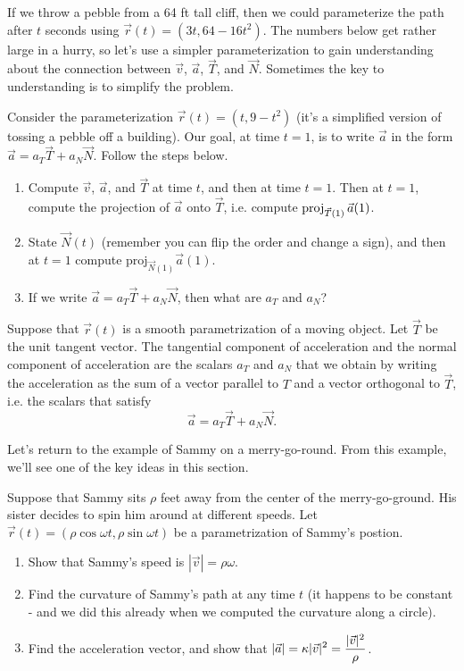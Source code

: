 If we throw a pebble from a 64 ft tall cliff, then we could parameterize the path after $t$ seconds using $\vec r(t) = (3t,64-16t^2)$. The numbers below get rather large in a hurry, so let's use a simpler parameterization to gain understanding about the connection between $\vec v$, $\vec a$, $\vec T$, and $\vec N$.  Sometimes the key to understanding is to simplify the problem.
\begin{problem}
Consider the parameterization $\vec r(t) = (t,9-t^2)$ (it's a simplified version of tossing a pebble off a building). Our goal, at time $t=1$, is to write $\vec a$ in the form $\vec a = a_T\vec T+a_N\vec N.$ Follow the steps below.
\begin{enumerate}
 \item Compute $\vec v$, $\vec a$, and $\vec T$ at time $t$, and then at time $t=1$. Then at $t=1$, compute the projection of $\vec a$ onto $\vec T$, i.e. compute $\operatorname{proj}_{\vec T(1)}\vec a(1)$.
 \item State $\vec N(t)$ (remember you can flip the order and change a sign), and then at $t=1$ compute $\text{proj}_{\vec N(1)}\vec a(1)$. 
 \item If we write $\vec a = a_T\vec T +a_N\vec N$, then what are $a_T$ and $a_N$?
\end{enumerate}
  
\end{problem}



\begin{definition}
 Suppose that $\vec r(t)$ is a smooth parametrization of a moving object.  Let $\vec T$ be the unit tangent vector. The tangential component of acceleration and the normal component of acceleration are the scalars $a_T$ and $a_N$ that we obtain by writing the acceleration as the sum of a vector parallel to $T$ and a vector orthogonal to $\vec T$, i.e. the scalars that satisfy
$$\vec a = a_T\vec T+a_N\vec N.$$
\end{definition}

Let's return to the example of Sammy on a merry-go-round.  From this example, we'll see one of the key ideas in this section.
\begin{problem*}
 Suppose that Sammy sits $\rho$ feet away from the center of the merry-go-ground. His sister decides to spin him around at different speeds.  Let $\vec r(t) = (\rho \cos \omega t, \rho \sin \omega t)$ be a parametrization of Sammy's postion.
\begin{enumerate}
 \item Show that Sammy's speed is $|\vec v|=\rho \omega$.  
 \item Find the curvature of Sammy's path at any time $t$ (it happens to be constant - and we did this already when we computed the curvature along a circle).
 \item Find the acceleration vector, and show that $\displaystyle |\vec a| = \kappa |\vec v|^2 = \frac{|\vec v|^2}{\rho}$.
\end{enumerate}
\end{problem*}

